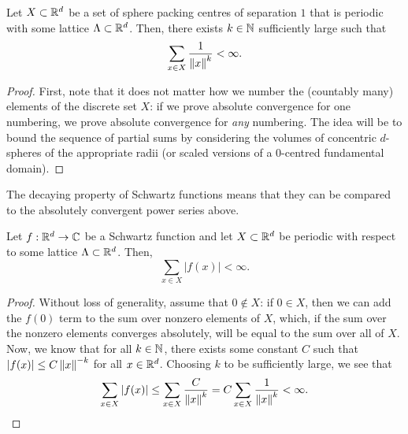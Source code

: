 \begin{lemma}\label{lemma:inv-power-summable}
  Let $X \subset \mathbb{R}^d$ be a set of sphere packing centres of separation $1$ that is periodic with some lattice $\Lambda \subset \mathbb{R}^d$. Then, there exists $k \in \mathbb{N}$ sufficiently large such that
  \[
    \sum_{x \in X} \frac{1}{\left\lVert x \right\rVert^{k}} < \infty.
  \]
\end{lemma}
\begin{proof}
  First, note that it does not matter how we number the (countably many) elements of the discrete set $X$: if we prove absolute convergence for one numbering, we prove absolute convergence for \emph{any} numbering. The idea will be to bound the sequence of partial sums by considering the volumes of concentric $d$-spheres of the appropriate radii (or scaled versions of a $0$-centred fundamental domain).



\end{proof}

The decaying property of Schwartz functions means that they can be compared to the absolutely convergent power series above.

\begin{lemma}\label{lemma:Schwartz-summable}
  Let $f : \mathbb{R}^d \to \mathbb{C}$ be a Schwartz function and let $X \subset \mathbb{R}^d$ be periodic with respect to some lattice $\Lambda \subset \mathbb{R}^d$. Then,
  \[
    \sum_{x \in X} |f(x)| < \infty.
  \]
\end{lemma}
\begin{proof}
  Without loss of generality, assume that $0 \notin X$: if $0 \in X$, then we can add the $f(0)$ term to the sum over nonzero elements of $X$, which, if the sum over the nonzero elements converges absolutely, will be equal to the sum over all of $X$. Now, we know that for all $k \in \mathbb{N}$, there exists some constant $C$ such that $|f(x)| \leq C\left\lVert x \right\rVert^{-k}$ for all $x \in \mathbb{R}^d$. Choosing $k$ to be sufficiently large, we see that
  \[
    \sum_{x \in X} |f(x)| \leq \sum_{x \in X} \frac{C}{\left\lVert x \right\rVert^{k}} = C \sum_{x \in X} \frac{1}{\left\lVert x \right\rVert^k} < \infty.
  \]
\end{proof}

